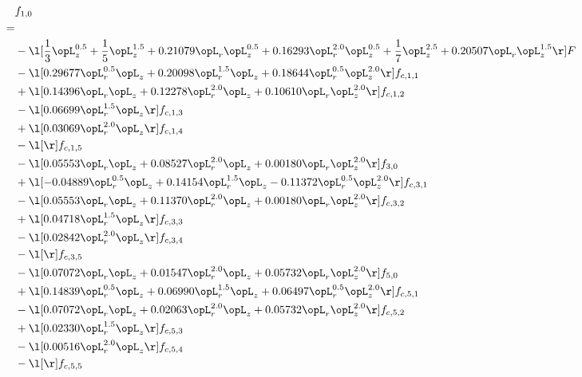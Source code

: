 \begin{alignat}{2} 
\label{eq:f_10_2} 
& f_{1,0} \nonumber \\ 
 = \\ 
& - \l[ \frac{1}{3} \opL_z^{0.5} + \frac{1}{5} \opL_z^{1.5} +  0.21079 \opL_r \opL_z^{0.5} +  0.16293 \opL_r^{2.0} \opL_z^{0.5} + \frac{1}{7} \opL_z^{2.5} +  0.20507 \opL_r \opL_z^{1.5}  \r] F \nonumber \\ 
& - \l[  0.29677 \opL_r^{0.5} \opL_z +  0.20098 \opL_r^{1.5} \opL_z +  0.18644 \opL_r^{0.5} \opL_z^{2.0}  \r] f_{c,1,1} \nonumber \\ 
& + \l[  0.14396 \opL_r \opL_z +  0.12278 \opL_r^{2.0} \opL_z +  0.10610 \opL_r \opL_z^{2.0}  \r] f_{c,1,2} \nonumber \\ 
& - \l[  0.06699 \opL_r^{1.5} \opL_z  \r] f_{c,1,3} \nonumber \\ 
& + \l[  0.03069 \opL_r^{2.0} \opL_z  \r] f_{c,1,4} \nonumber \\ 
& - \l[  \r] f_{c,1,5} \nonumber \\ 
& - \l[  0.05553 \opL_r \opL_z +  0.08527 \opL_r^{2.0} \opL_z +  0.00180 \opL_r \opL_z^{2.0}  \r] f_{3,0} \nonumber \\ 
& + \l[  -0.04889 \opL_r^{0.5} \opL_z +  0.14154 \opL_r^{1.5} \opL_z   -0.11372 \opL_r^{0.5} \opL_z^{2.0}  \r] f_{c,3,1} \nonumber \\ 
& - \l[  0.05553 \opL_r \opL_z +  0.11370 \opL_r^{2.0} \opL_z +  0.00180 \opL_r \opL_z^{2.0}  \r] f_{c,3,2} \nonumber \\ 
& + \l[  0.04718 \opL_r^{1.5} \opL_z  \r] f_{c,3,3} \nonumber \\ 
& - \l[  0.02842 \opL_r^{2.0} \opL_z  \r] f_{c,3,4} \nonumber \\ 
& - \l[  \r] f_{c,3,5} \nonumber \\ 
& - \l[  0.07072 \opL_r \opL_z +  0.01547 \opL_r^{2.0} \opL_z +  0.05732 \opL_r \opL_z^{2.0}  \r] f_{5,0} \nonumber \\ 
& + \l[  0.14839 \opL_r^{0.5} \opL_z +  0.06990 \opL_r^{1.5} \opL_z +  0.06497 \opL_r^{0.5} \opL_z^{2.0}  \r] f_{c,5,1} \nonumber \\ 
& - \l[  0.07072 \opL_r \opL_z +  0.02063 \opL_r^{2.0} \opL_z +  0.05732 \opL_r \opL_z^{2.0}  \r] f_{c,5,2} \nonumber \\ 
& + \l[  0.02330 \opL_r^{1.5} \opL_z  \r] f_{c,5,3} \nonumber \\ 
& - \l[  0.00516 \opL_r^{2.0} \opL_z  \r] f_{c,5,4} \nonumber \\ 
& - \l[  \r] f_{c,5,5} \nonumber \\ 

\end{alignat}
